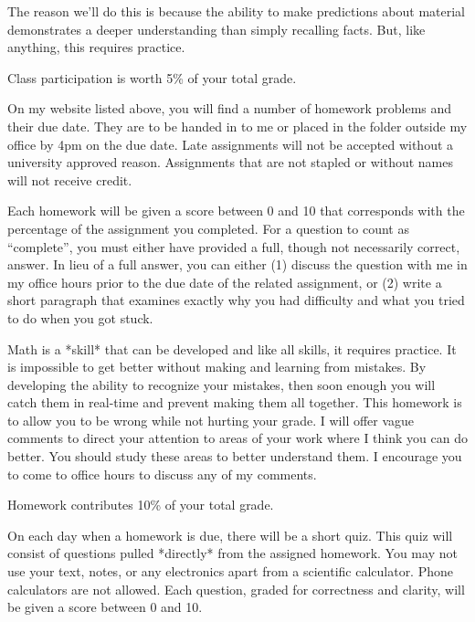 \documentclass{assets/syllabus}
\begin{document}
The reason we'll do this is because the ability to make
predictions about material demonstrates a deeper
understanding than simply recalling facts. But, like
anything, this requires practice.

Class participation is worth 5\% of your total grade.


On my website listed above, you will find a number of
homework problems and their due date. They are to be handed
in to me or placed in the folder outside my office by 4pm on
the due date. Late assignments will not be accepted without
a university approved reason. Assignments that are not
stapled or without names will not receive credit.

Each homework will be given a score between 0 and 10 that
corresponds with the percentage of the assignment you
completed. For a question to count as ``complete'', you must
either have provided a full, though not necessarily correct,
answer. In lieu of a full answer, you can either (1) discuss
the question with me in my office hours prior to the due
date of the related assignment, or (2) write a short
paragraph that examines exactly why you had difficulty and
what you tried to do when you got stuck.

Math is a *skill* that can be developed and like all
skills, it requires practice.  It is impossible to get
better without making and learning from mistakes.  By
developing the ability to recognize your mistakes, then soon
enough you will catch them in real-time and prevent making
them all together. This homework is to allow you to be wrong
while not hurting your grade.  I will offer vague comments
to direct your attention to areas of your work where I think
you can do better. You should study these areas to better
understand them. I encourage you to come to office hours to
discuss any of my comments.

Homework contributes 10\% of your total grade.



On each day when a homework is due, there will be a short
quiz. This quiz will consist of questions pulled *directly*
from the assigned homework. You may not use your text,
notes, or any electronics apart from a scientific
calculator. Phone calculators are not allowed. Each
question, graded for correctness and clarity, will be given
a score between 0 and 10.
\end{document}
